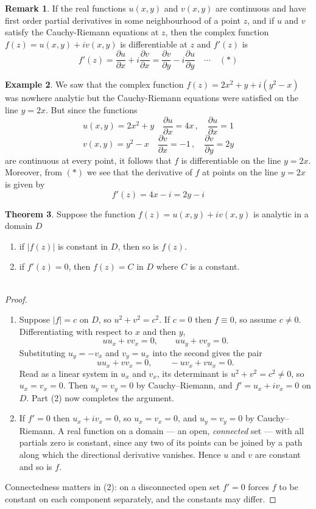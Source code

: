\documentclass[11pt,a4paper]{article}
\theoremstyle{definition}
\newtheorem{thm}{Theorem}[section]
\newtheorem{example}[thm]{Example}
\newtheorem{remark}[thm]{Remark}
\begin{document}
\begin{remark}
If the real functions $u(x,y)$ and $v(x,y)$ are continuous and have first order partial derivatives in some neighbourhood of a point $z$, and if $u$ and $v$ satisfy the Cauchy-Riemann equations at $z$, then the complex function $f(z) = u(x,y) + iv(x,y)$ is differentiable at $z$ and $f'(z)$ is 
$$\boxed{f'(z) = \frac{\partial u}{\partial x} + i\frac{\partial v}{\partial x} = \frac{\partial v}{\partial y} -i \frac{\partial u}{\partial y}\quad \cdots\quad  (*)}$$
\end{remark}

\begin{example}
We saw that the complex function $f(z) = 2x^2 + y + i(y^2 - x)$ was nowhere analytic but the Cauchy-Riemann equations were satisfied on the line $y = 2x$. But since the functions $$u(x,y) = 2x^2 + y\quad  \frac{\partial u}{\partial x} = 4x \,, \quad  \frac{\partial u}{\partial x} = 1$$
$$v(x,y) = y^2 - x\quad \frac{\partial v}{\partial x} = -1\,,\quad  \frac{\partial v}{\partial y} = 2y$$
are continuous at every point, it follows that $f$ is differentiable on the line $y = 2x$. Moreover, from $(*)$ we see that the derivative of $f$ at points on the line $y = 2x$ is given by $$ f'(z)  = 4x - i = 2y - i$$
\end{example}

\begin{thm}
Suppose the function $f(z) = u(x,y) + iv(x,y)$ is analytic in a domain $D$
\begin{enumerate}
\item if $\left|f(z)\right|$ is constant in $D$, then so is $f(z)$.
\item if $f'(z) = 0$, then $f(z) = C$ in $D$ where $C$ is a constant.\\\\
\end{enumerate}

\begin{proof}
\begin{enumerate}
\item Suppose $\left|f\right|=c$ on $D$, so $u^2+v^2=c^2$. If $c=0$ then
$f\equiv 0$, so assume $c\neq 0$. Differentiating with respect to $x$ and then
$y$,
$$uu_x+vv_x=0,\qquad uu_y+vv_y=0 .$$
Substituting $u_y=-v_x$ and $v_y=u_x$ into the second gives the pair
$$uu_x+vv_x=0,\qquad -uv_x+vu_x=0 .$$
Read as a linear system in $u_x$ and $v_x$, its determinant is
$u^2+v^2=c^2\neq 0$, so $u_x=v_x=0$. Then $u_y=v_y=0$ by Cauchy--Riemann, and
$f'=u_x+iv_x=0$ on $D$. Part (2) now completes the argument.

\item If $f'=0$ then $u_x+iv_x=0$, so $u_x=v_x=0$, and $u_y=v_y=0$ by
Cauchy--Riemann. A real function on a domain --- an open, \emph{connected} set
--- with all partials zero is constant, since any two of its points can be
joined by a path along which the directional derivative vanishes. Hence $u$ and
$v$ are constant and so is $f$.
\end{enumerate}
Connectedness matters in (2): on a disconnected open set $f'=0$ forces $f$ to be
constant on each component separately, and the constants may differ.
\end{proof}
\end{thm}
\end{document}

